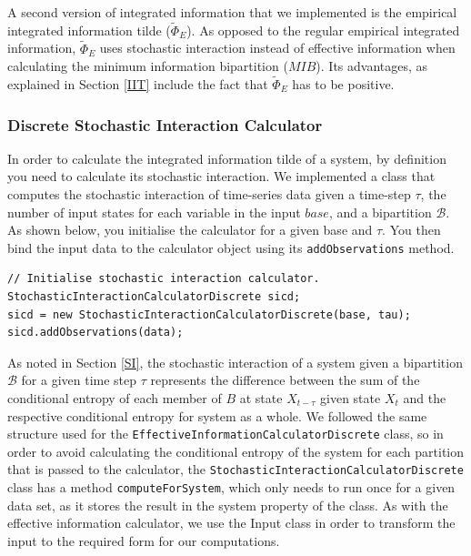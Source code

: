 \documentclass[a4paper,11pt]{article}
\begin{document}
A second version of integrated information that we implemented is the empirical integrated information tilde ($\widetilde{\Phi}_{E}$). As opposed to the regular empirical integrated information, $\widetilde{\Phi}_{E}$ uses stochastic interaction instead of effective information when calculating the minimum information bipartition ($MIB$). Its advantages, as explained in Section \ref{IIT} include the fact that $\widetilde{\Phi}_{E}$ has to be positive.

\subsubsection{Discrete Stochastic Interaction Calculator}
\label{sec:impl:stochastic}

In order to calculate the integrated information tilde of a system, by definition you need to calculate its stochastic interaction. We implemented a class that computes the stochastic interaction of time-series data given a time-step $\tau$, the number of input states for each variable in the input $base$, and a bipartition $\mathcal{B}$. As shown below, you initialise the calculator for a given base and $\tau$. You then bind the input data to the calculator object using its \texttt{addObservations} method.

\begin{verbatim}
// Initialise stochastic interaction calculator.
StochasticInteractionCalculatorDiscrete sicd;
sicd = new StochasticInteractionCalculatorDiscrete(base, tau);
sicd.addObservations(data);
\end{verbatim}

As noted in Section \ref{SI}, the stochastic interaction of a system given a bipartition $\mathcal{B}$ for a given time step $\tau$ represents the difference between the sum of the conditional entropy of each member of $B$ at state $X_{t-\tau}$ given state $X_t$ and the respective conditional entropy for system as a whole. We followed the same structure used for the \texttt{EffectiveInformationCalculatorDiscrete} class, so in order to avoid calculating the conditional entropy of the system for each partition that is passed to the calculator, the \texttt{StochasticInteractionCalculatorDiscrete} class has a method \texttt{computeForSystem}, which only needs to run once for a given data set, as it stores the result in the system property of the class. As with the effective information calculator, we use the Input class in order to transform the input to the required form for our computations.
\end{document}
